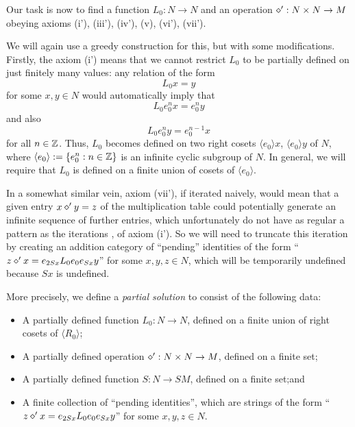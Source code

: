Our task is now to find a function $L_0: N \to N$ and an operation $\diamond': N \times N \to M$ obeying axioms (i'), (iii'), (iv'), (v), (vi'), (vii').

We will again use a greedy construction for this, but with some modifications.  Firstly, the axiom (i') means that we cannot restrict $L_0$ to be partially defined on just finitely many values: any relation of the form
$$ L_0 x = y$$
for some $x,y \in N$ would automatically imply that
\begin{equation}\label{itero}
 L_0 e_0^n x = e_0^n y
\end{equation}
and also
\begin{equation}\label{itero-2}
  L_0 e_0^n y = e_0^{n-1} x
\end{equation}
for all $n \in \mathbb{Z}$.  Thus, $L_0$ becomes defined on two right cosets $\langle e_0 \rangle x$, $\langle e_0 \rangle y$ of $N$, where $\langle e_0 \rangle := \{ e_0^n: n \in \mathbb{Z}\}$ is an infinite cyclic subgroup of $N$.  In general, we will require that $L_0$ is defined on a finite union of cosets of $\langle e_0\rangle$.

In a somewhat similar vein, axiom (vii'), if iterated naively, would mean that a given entry $x \diamond' y = z$ of the multiplication table could potentially generate an infinite sequence of further entries, which unfortunately do not have as regular a pattern as the iterations ,  of axiom (i').  So we will need to truncate this iteration by creating an addition category of ``pending'' identities of the form ``$z \diamond' x = e_{2Sx} L_0 e_0 e_{Sx} y$'' for some $x,y,z \in N$, which will be temporarily undefined because $Sx$ is undefined.

More precisely, we define a \emph{partial solution} to consist of the following data:
\begin{itemize}
  \item A partially defined function $L_0: N \to N$, defined on a finite union of right cosets of $\langle R_0\rangle$;
  \item A partially defined operation $\diamond': N \times N \to M$, defined on a finite set;
  \item A partially defined function $S: N \to SM$, defined on a finite set;and
  \item A finite collection of ``pending identities'', which are strings of the form ``$z \diamond' x = e_{2Sx} L_0 e_0 e_{Sx} y$'' for some $x,y,z \in N$.
\end{itemize}

